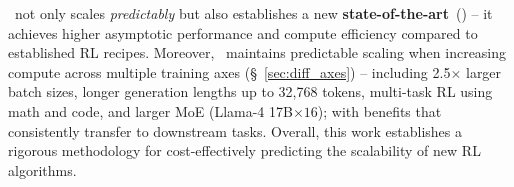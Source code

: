 \scalerl\ not only scales \emph{predictably} but also establishes a new \textbf{state-of-the-art}~() -- it achieves higher asymptotic performance and compute efficiency compared to established RL recipes.  Moreover, \scalerl\ maintains predictable scaling when increasing compute across multiple training axes (\S~\ref{sec:diff_axes}) -- including 2.5$\times$ larger batch sizes, longer generation lengths up to 32,768 tokens, multi-task RL using math and code, and larger MoE (Llama-4 17B$\times16$); with benefits that consistently transfer to downstream tasks. Overall, this work establishes a rigorous methodology for cost-effectively predicting the scalability of new RL algorithms. 